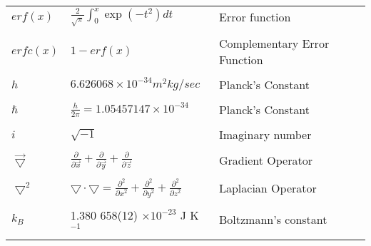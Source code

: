 \begin{tabular}{p{1.2in}p{2.5in}p{2.5in}}

$erf(x)$ & $\frac 2 {\sqrt{\pi}} \int_0^x \exp(-t^2) dt$ & Error function \\ \\

$erfc(x)$ & $1 - erf(x)$ & Complementary Error Function \\ \\

$h$ & $6.626068 \times 10 ^ {-34} m^2kg/sec$ & Planck's Constant \\ \\

$\hbar$ & $\frac h {2 \pi} = 1.05457147 \times 10 ^ {-34}$ & 
          Planck's Constant \\ \\

$i$ & $\sqrt{-1}$ & Imaginary number \\ \\

$\vec{\bigtriangledown}$ & $\frac{\partial}{\partial \vec{x}} +
\frac{\partial}{\partial \vec{y}} + \frac {\partial}{\partial \vec{z}}$ &
Gradient Operator \\ \\

$\bigtriangledown^2$ & $\bigtriangledown \cdot \bigtriangledown = \frac
{\partial ^2} {\partial x ^2} + \frac {\partial ^2} {\partial y^2} + \frac
{\partial ^2} {\partial z ^2}$ & Laplacian Operator \\ \\

$k_B$ & 1.380 658(12) $\times 10 ^ {-23}$ J K$^{-1}$ &
Boltzmann's constant \cite{CRC_Book} \\ \\

\end{tabular}
